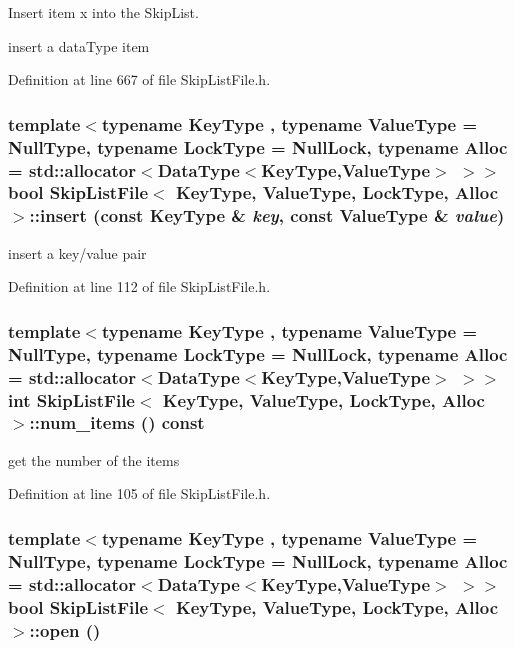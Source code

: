Insert item x into the SkipList. 

insert a dataType item 

Definition at line 667 of file SkipListFile.h.\hypertarget{classSkipListFile_92adc503de42daa3192010f295c0570b}{
\subsubsection[{insert}]{\setlength{\rightskip}{0pt plus 5cm}template$<$typename KeyType , typename ValueType  = NullType, typename LockType  = NullLock, typename Alloc  = std::allocator$<$DataType$<$KeyType,ValueType$>$ $>$$>$ bool {\bf SkipListFile}$<$ KeyType, ValueType, LockType, Alloc $>$::insert (const KeyType \& {\em key}, \/  const ValueType \& {\em value})}}
\label{classSkipListFile_92adc503de42daa3192010f295c0570b}


insert a key/value pair 

Definition at line 112 of file SkipListFile.h.\hypertarget{classSkipListFile_c6c8ae57ca3914f78eb96251c1bdd9bc}{
\subsubsection[{num\_\-items}]{\setlength{\rightskip}{0pt plus 5cm}template$<$typename KeyType , typename ValueType  = NullType, typename LockType  = NullLock, typename Alloc  = std::allocator$<$DataType$<$KeyType,ValueType$>$ $>$$>$ int {\bf SkipListFile}$<$ KeyType, ValueType, LockType, Alloc $>$::num\_\-items () const}}
\label{classSkipListFile_c6c8ae57ca3914f78eb96251c1bdd9bc}


get the number of the items 

Definition at line 105 of file SkipListFile.h.\hypertarget{classSkipListFile_e9cd69cc2e8fd96c0c1c03ebb84b2853}{
\subsubsection[{open}]{\setlength{\rightskip}{0pt plus 5cm}template$<$typename KeyType , typename ValueType  = NullType, typename LockType  = NullLock, typename Alloc  = std::allocator$<$DataType$<$KeyType,ValueType$>$ $>$$>$ bool {\bf SkipListFile}$<$ KeyType, ValueType, LockType, Alloc $>$::open ()}}
\label{classSkipListFile_e9cd69cc2e8fd96c0c1c03ebb84b2853}


